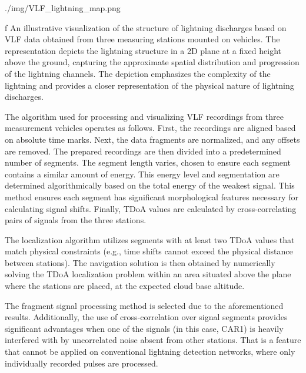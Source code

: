 \medskip
{}
\picw=15cm \cinspic ./img/VLF_lightning_map.png
\caption/f   An illustrative visualization of the structure of lightning discharges based on VLF data obtained from three measuring stations mounted on vehicles. The representation depicts the lightning structure in a 2D plane at a fixed height above the ground, capturing the approximate spatial distribution and progression of the lightning channels. The depiction emphasizes the complexity of the lightning and provides a closer representation of the physical nature of lightning discharges.  
\medskip

The algorithm used for processing and visualizing VLF recordings from three measurement vehicles operates as follows. First, the recordings are aligned based on absolute time marks. Next, the data fragments are normalized, and any offsets are removed. The prepared recordings are then divided into a predetermined number of segments. The segment length varies, chosen to ensure each segment contains a similar amount of energy. This energy level and segmentation are determined algorithmically based on the total energy of the weakest signal. This method ensures each segment has significant morphological features necessary for calculating signal shifts. Finally, TDoA values are calculated by cross-correlating pairs of signals from the three stations.

The localization algorithm utilizes segments with at least two TDoA values that match physical constraints (e.g., time shifts cannot exceed the physical distance between stations). The navigation solution is then obtained by numerically solving the TDoA localization problem within an area situated above the plane where the stations are placed, at the expected cloud base altitude.

The fragment signal processing method is selected due to the aforementioned results. Additionally, the use of cross-correlation over signal segments provides significant advantages when one of the signals (in this case, CAR1) is heavily interfered with by uncorrelated noise absent from other stations. That is a feature that cannot be applied on conventional lightning detection networks, where only individually recorded pulses are processed. 

